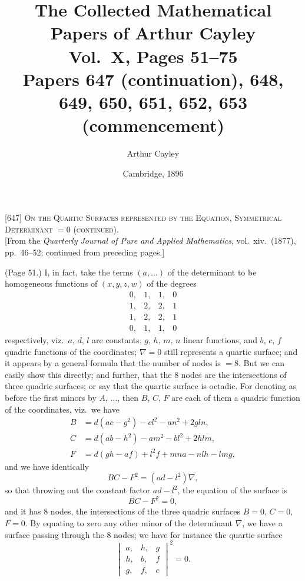 \documentclass[11pt,a4paper]{article}
\title{The Collected Mathematical Papers of Arthur Cayley\\[6pt]
\large Vol.~X, Pages 51--75 \\[4pt]
\normalsize Papers 647 (continuation), 648, 649, 650, 651, 652, 653 (commencement)}
\author{Arthur Cayley}
\date{Cambridge, 1896}
\begin{document}
\maketitle
\thispagestyle{fancy}

\setcounter{page}{51}


\begin{center}
\textsc{[647] On the Quartic Surfaces represented by the Equation, Symmetrical Determinant $= 0$ (continued).}\\[0.5em]
[From the \textit{Quarterly Journal of Pure and Applied Mathematics}, vol.~xiv.\ (1877), pp.~46--52; continued from preceding pages.]
\end{center}

\medskip

\noindent (Page 51.) I, in fact, take the terms $(a, \ldots)$ of the determinant to be homogeneous functions of $(x, y, z, w)$ of the degrees
\[
\begin{array}{cccc}
0, & 1, & 1, & 0 \\
1, & 2, & 2, & 1 \\
1, & 2, & 2, & 1 \\
0, & 1, & 1, & 0
\end{array}
\]
respectively, viz.\ $a$, $d$, $l$ are constants, $g$, $h$, $m$, $n$ linear functions, and $b$, $c$, $f$ quadric functions of the coordinates; $\nabla = 0$ still represents a quartic surface; and it appears by a general formula that the number of nodes is $= 8$. But we can easily show this directly; and further, that the $8$ nodes are the intersections of three quadric surfaces; or say that the quartic surface is octadic. For denoting as before the first minors by $A$, $\ldots$, then $B$, $C$, $F$ are each of them a quadric function of the coordinates, viz.\ we have
\begin{align*}
B &= d(ac - g^2) - cl^2 - an^2 + 2gln, \\
C &= d(ab - h^2) - am^2 - bl^2 + 2hlm, \\
F &= d(gh - af) + l^2 f + mna - nlh - lmg,
\end{align*}
and we have identically
\[
BC - F^2 = (ad - l^2) \nabla,
\]
so that throwing out the constant factor $ad - l^2$, the equation of the surface is
\[
BC - F^2 = 0,
\]
and it has $8$ nodes, the intersections of the three quadric surfaces $B = 0$, $C = 0$, $F = 0$. By equating to zero any other minor of the determinant $\nabla$, we have a surface passing through the $8$ nodes; we have for instance the quartic surface
\[
\begin{vmatrix} a, & h, & g \\ h, & b, & f \\ g, & f, & c \end{vmatrix}^2 = 0.
\]
\end{document}
